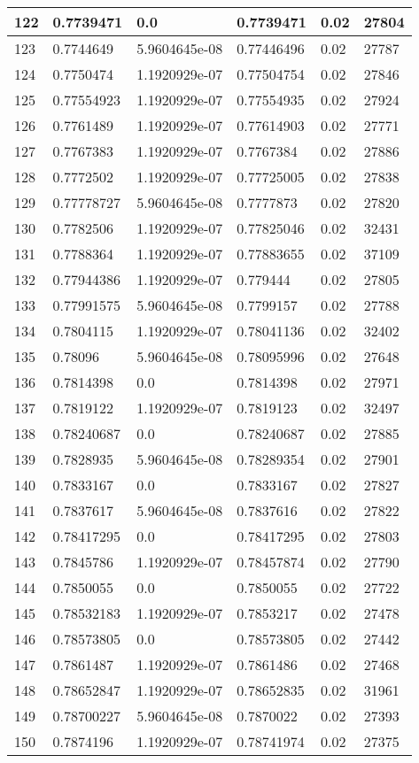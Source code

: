 \begin{longtable}{|l|l|l|l|l|l|}
122 & 0.7739471 & 0.0 & 0.7739471 & 0.02 & 27804 \\ \hline 
123 & 0.7744649 & 5.9604645e-08 & 0.77446496 & 0.02 & 27787 \\ \hline 
124 & 0.7750474 & 1.1920929e-07 & 0.77504754 & 0.02 & 27846 \\ \hline 
125 & 0.77554923 & 1.1920929e-07 & 0.77554935 & 0.02 & 27924 \\ \hline 
126 & 0.7761489 & 1.1920929e-07 & 0.77614903 & 0.02 & 27771 \\ \hline 
127 & 0.7767383 & 1.1920929e-07 & 0.7767384 & 0.02 & 27886 \\ \hline 
128 & 0.7772502 & 1.1920929e-07 & 0.77725005 & 0.02 & 27838 \\ \hline 
129 & 0.77778727 & 5.9604645e-08 & 0.7777873 & 0.02 & 27820 \\ \hline 
130 & 0.7782506 & 1.1920929e-07 & 0.77825046 & 0.02 & 32431 \\ \hline 
131 & 0.7788364 & 1.1920929e-07 & 0.77883655 & 0.02 & 37109 \\ \hline 
132 & 0.77944386 & 1.1920929e-07 & 0.779444 & 0.02 & 27805 \\ \hline 
133 & 0.77991575 & 5.9604645e-08 & 0.7799157 & 0.02 & 27788 \\ \hline 
134 & 0.7804115 & 1.1920929e-07 & 0.78041136 & 0.02 & 32402 \\ \hline 
135 & 0.78096 & 5.9604645e-08 & 0.78095996 & 0.02 & 27648 \\ \hline 
136 & 0.7814398 & 0.0 & 0.7814398 & 0.02 & 27971 \\ \hline 
137 & 0.7819122 & 1.1920929e-07 & 0.7819123 & 0.02 & 32497 \\ \hline 
138 & 0.78240687 & 0.0 & 0.78240687 & 0.02 & 27885 \\ \hline 
139 & 0.7828935 & 5.9604645e-08 & 0.78289354 & 0.02 & 27901 \\ \hline 
140 & 0.7833167 & 0.0 & 0.7833167 & 0.02 & 27827 \\ \hline 
141 & 0.7837617 & 5.9604645e-08 & 0.7837616 & 0.02 & 27822 \\ \hline 
142 & 0.78417295 & 0.0 & 0.78417295 & 0.02 & 27803 \\ \hline 
143 & 0.7845786 & 1.1920929e-07 & 0.78457874 & 0.02 & 27790 \\ \hline 
144 & 0.7850055 & 0.0 & 0.7850055 & 0.02 & 27722 \\ \hline 
145 & 0.78532183 & 1.1920929e-07 & 0.7853217 & 0.02 & 27478 \\ \hline 
146 & 0.78573805 & 0.0 & 0.78573805 & 0.02 & 27442 \\ \hline 
147 & 0.7861487 & 1.1920929e-07 & 0.7861486 & 0.02 & 27468 \\ \hline 
148 & 0.78652847 & 1.1920929e-07 & 0.78652835 & 0.02 & 31961 \\ \hline 
149 & 0.78700227 & 5.9604645e-08 & 0.7870022 & 0.02 & 27393 \\ \hline 
150 & 0.7874196 & 1.1920929e-07 & 0.78741974 & 0.02 & 27375 \\ \hline 
\end{longtable}